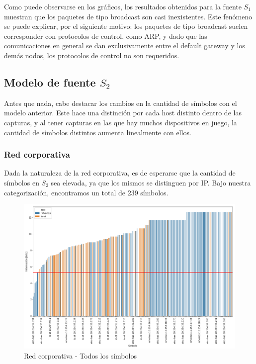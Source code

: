 Como puede observarse en los gráficos, los resultados obtenidos para la fuente $S_1$ muestran que los paquetes de tipo broadcast son casi inexistentes. Este fenómeno se puede explicar, por el siguiente motivo: los paquetes de tipo broadcast suelen corresponder con protocolos de control, como ARP, y dado que las comunicaciones en general se dan exclusivamente entre el default gateway y los demás nodos, los protocolos de control no son requeridos.

\subsection{Modelo de fuente \texorpdfstring{$S_2$}{S2}}

Antes que nada, cabe destacar los cambios en la cantidad de símbolos con el modelo anterior. Este hace una distinción por cada host distinto dentro de las capturas, y al tener capturas en las que hay muchos dispositivos en juego, la cantidad de símbolos distintos aumenta linealmente con ellos.

\subsubsection{Red corporativa}

Dada la naturaleza de la red corporativa, es de esperarse que la cantidad de símbolos en $S_2$ sea elevada, ya que los mismos se distinguen por IP. Bajo nuestra categorización, encontramos un total de 239 símbolos.

\begin{figure}[H]
	\centering
	\includegraphics[width=\linewidth]{imagenes/despegar_barras_all}
	\caption{Red corporativa - Todos los símbolos}
\end{figure}

